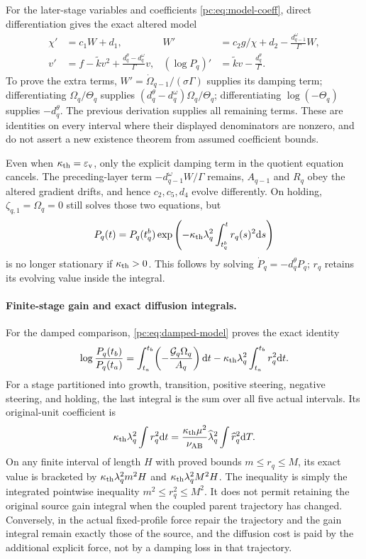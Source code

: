 For the later-stage variables and coefficients \eqref{pc:eq:model-coeff}, direct differentiation gives the exact altered model
\begin{align}\label{pc:eq:damped-model}
 \chi'&=c_1W+d_1,&
 W'&=c_2g/\chi+d_2-\frac{d_{q-1}^\omega}{\Gamma}W,\\
 v'&=f-\widetilde k v^2+\frac{d_q^\theta-d_q^\omega}{\Gamma}v,&
 (\log P_q)'&=\widetilde k v-\frac{d_q^\theta}{\Gamma}.\nonumber
\end{align}
To prove the extra terms, $W'=\dot\Omega_{q-1}/(\sigma\Gamma)$ supplies its damping term; differentiating $\Omega_q/\Theta_q$ supplies $(d_q^\theta-d_q^\omega)\Omega_q/\Theta_q$; differentiating $\log(-\Theta_q)$ supplies $-d_q^\theta$. The previous derivation supplies all remaining terms. These are identities on every interval where their displayed denominators are nonzero, and do not assert a new existence theorem from assumed coefficient bounds.

Even when $\kappa_{\mathrm{th}}=\varepsilon_{\mathrm v}$, only the explicit damping term in the quotient equation cancels. The preceding-layer term $-d_{q-1}^\omega W/\Gamma$ remains, $A_{q-1}$ and $R_q$ obey the altered gradient drifts, and hence $c_2,c_5,d_4$ evolve differently. On holding, $\zeta_{q,1}=\Omega_q=0$ still solves those two equations, but
\[
 P_q(t)=P_q(t_q^b)\exp\left(-\kappa_{\mathrm{th}}\lambda_q^2\int_{t_q^b}^{t}r_q(s)^2\mathrm d s\right)
\]
is no longer stationary if $\kappa_{\mathrm{th}}>0$. This follows by solving $\dot P_q=-d_q^\theta P_q$; $r_q$ retains its evolving value inside the integral.

\paragraph{Finite-stage gain and exact diffusion integrals.}
For the damped comparison, \eqref{pc:eq:damped-model} proves the exact identity
\[
 \log\frac{P_q(t_b)}{P_q(t_a)}
 =\int_{t_a}^{t_b}\!\left(-\frac{\mathcal G_q\Omega_q}{A_q}\right)\mathrm d t
 -\kappa_{\mathrm{th}}\lambda_q^2\int_{t_a}^{t_b}r_q^2\mathrm d t.
\]
For a stage partitioned into growth, transition, positive steering, negative steering, and holding, the last integral is the sum over all five actual intervals. Its original-unit coefficient is
\[
 \kappa_{\mathrm{th}}\lambda_q^2\int r_q^2\mathrm d t
 =\frac{\kappa_{\mathrm{th}}\mu^2}{\nu_{\mathrm{AB}}}\widehat\lambda_q^2
 \int \widehat r_q^2\mathrm d T.
\]
On any finite interval of length $H$ with proved bounds $m\le r_q\le M$, its exact value is bracketed by $\kappa_{\mathrm{th}}\lambda_q^2m^2H$ and $\kappa_{\mathrm{th}}\lambda_q^2M^2H$. The inequality is simply the integrated pointwise inequality $m^2\le r_q^2\le M^2$. It does not permit retaining the original source gain integral when the coupled parent trajectory has changed. Conversely, in the actual fixed-profile force repair the trajectory and the gain integral remain exactly those of the source, and the diffusion cost is paid by the additional explicit force, not by a damping loss in that trajectory.

